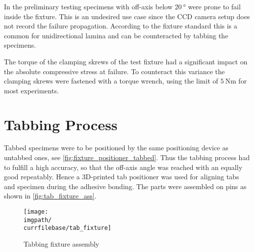 In the preliminary testing specimens with off-axis below $\SI{20}{\degree}$ were prone to fail inside the fixture. This is an undesired use case since the CCD camera setup does not record the failure propagation. According to the fixture standard \cite{D6641standard} this is a common for unidirectional lamina and can be counteracted by tabbing the specimens.

The torque of the clamping skrews of the test fixture had a significant impact on the absolute compressive stress at failure. To counteract this variance the clamping skrews were fastened with a torque wrench, using the limit of $\SI{5}{\newton\meter}$ for most experiments.

\section{Tabbing Process}
\label{sec:tabbing_process}

Tabbed specimens were to be positioned by the same positioning device as untabbed ones, see \autoref{fig:fixture_positioner_tabbed}. Thus the tabbing process had to fulfill a high accuracy, so that the off-axis angle was reached with an equally good repeatably. Hence a 3D-printed tab positioner was used for aligning tabs and specimen during the adhesive bonding. The parts were assembled on pins as shown in \autoref{fig:tab_fixture_ass}.

\begin{figure}[!ht]
    \centering
    \texttt{[image: \\imgpath/\\currfilebase/tab\_fixture]}
    \caption{Tabbing fixture assembly}
    \label{fig:tab_fixture_ass}
\end{figure}
